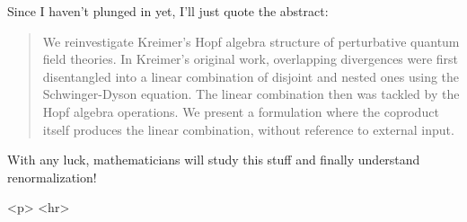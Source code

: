Since I haven't plunged in yet, I'll just quote the abstract:

\begin{quote}
        We reinvestigate Kreimer's Hopf algebra structure of perturbative
	quantum field theories. In Kreimer's original work, overlapping
	divergences were first disentangled into a linear combination
	of disjoint and nested ones using the Schwinger-Dyson
	equation. The linear combination then was tackled by the Hopf
	algebra operations. We present a formulation where the
	coproduct itself produces the linear combination, without
	reference to external input.
\end{quote}
    
With any luck, mathematicians will study this stuff and finally understand
renormalization!









<p> <hr>



